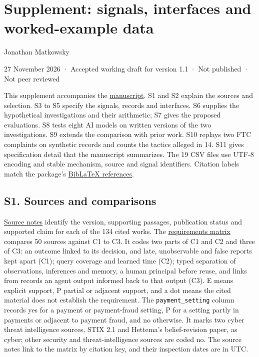 \documentclass[
  11pt,
]{article}
\author{}
\date{}
\begin{document}
\FloatBarrier

\begingroup\raggedright{}

\hypertarget{supplement-signals-interfaces-and-worked-example-data}{%
\section{Supplement: signals, interfaces and worked-example
data}\label{supplement-signals-interfaces-and-worked-example-data}}

\endgroup

\suppressfloats[t]

Jonathan Matkowsky

27 November 2026 · Accepted working draft for version 1.1 · Not
published · Not peer reviewed

This supplement accompanies the \href{MANUSCRIPT.md}{manuscript}. S1 and
S2 explain the sources and selection. S3 to S5 specify the signals,
records and interfaces. S6 supplies the hypothetical investigations and
their arithmetic; S7 gives the proposed evaluations. S8 tests eight AI
models on written versions of the two investigations. S9 extends the
comparison with prior work. S10 replays two FTC complaints on synthetic
records and counts the tactics alleged in 14. S11 gives specification
detail that the manuscript summarizes. The 19 CSV files use \mbox{UTF-8}
encoding and stable mechanism, source and signal identifiers. Citation
labels match the package's \href{REFERENCES.bib}{BibLaTeX references}.

\FloatBarrier

\hypertarget{s1.-sources-and-comparisons}{%
\subsection{S1. Sources and
comparisons}\label{s1.-sources-and-comparisons}}

\suppressfloats[t]

\href{SUPPLEMENT/S1_CITED_SOURCE_NOTES.csv}{Source notes} identify the
version, supporting passages, publication status and supported claim for
each of the 134 cited works. The
\href{SUPPLEMENT/S1_REQUIREMENTS_MATRIX.csv}{requirements matrix}
compares 50 sources against C1 to C3. It codes two parts of C1 and C2
and three of C3: an outcome linked to its decision, and late,
unobservable and false reports kept apart (C1); query coverage and
learned time (C2); typed separation of observations, inferences and
memory, a human principal before reuse, and links from records an agent
output informed back to that output (C3). E means explicit support, P
partial or adjacent support, and a dot means the cited material does not
establish the requirement. The \texttt{payment\_setting} column records
yes for a payment or payment-fraud setting, P for a setting partly in
payments or adjacent to payment fraud, and no otherwise. It marks two
cyber threat intelligence sources, STIX 2.1 and Hettema's
belief-revision paper, as cyber; other security and threat-intelligence
sources are coded no. The source notes link to the matrix by citation
key, and their inspection dates are in UTC.
\end{document}
